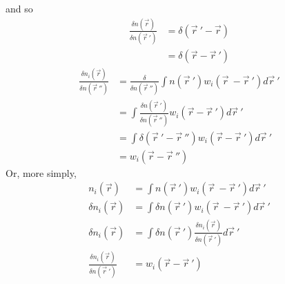 \documentclass[double,12pt]{revtex4-2}
\begin{document}
and so
\begin{align} 
  \frac{\delta n(\vec r)}{\delta n(\vec r~')} &= \delta (\vec r~'-\vec r) \\
                                               &= \delta (\vec r-\vec r~') 
\end{align} 
\begin{align} 
   \frac{\delta n_i(\vec r)}{\delta n(\vec r~'')}  &= \frac{\delta}
   {\delta n(\vec r~'')}\int n(\vec r~')w_i(\vec r~-\vec r~')d\vec r~'\\
   &= \int \frac{\delta n(\vec r~')}{\delta n(\vec r~'')}w_i(\vec r
   -\vec r~') d\vec r~' \\
   &= \int \delta (\vec r~' -\vec r~'')w_i(\vec r-\vec r~') d\vec r~'\\
   &= w_i(\vec r-\vec r~'') 
\end{align}
Or, more simply,
\begin{align} 
   n_i(\vec r)  &= \int n(\vec r~')w_i(\vec r~-\vec r~')d\vec r~'\\
   \delta n_i(\vec r)  &= \int \delta n(\vec r~')w_i(\vec r~-\vec r~')d\vec r~'\\
   \delta n_i(\vec r)  &= \int \delta n(\vec r~')\frac{\delta n_i(\vec r)}{\delta n(\vec r~')}d\vec r~'\\
   \frac{\delta n_i(\vec r)}{\delta n(\vec r~')}&= w_i(\vec r-\vec r~') 
\end{align}
\end{document}
